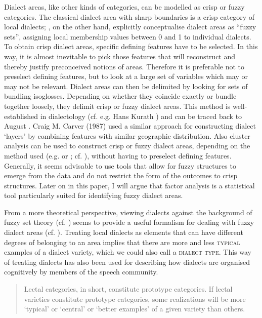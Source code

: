 \documentclass[output=paper]{LSP/langsci}
\begin{document}
Dialect areas, like other kinds of categories, can be modelled as crisp or fuzzy categories. The classical dialect area with sharp boundaries is a crisp category of local dialects; \citet[108--113]{preston_applications_1993}, on the other hand, explicitly conceptualise dialect areas as “fuzzy sets”, assigning local membership values between 0 and 1 to individual dialects. To obtain crisp dialect areas, specific defining features have to be selected. In this way, it is almost inevitable to pick those features that will reconstruct and thereby justify preconceived notions of areas. Therefore it is preferable not to preselect defining features, but to look at a large set of variables which may or may not be relevant. Dialect areas can then be delimited by looking for sets of bundling isoglosses. Depending on whether they coincide exactly or bundle together loosely, they delimit crisp or fuzzy dialect areas. This method is well-established in dialectology (cf. e.g. Hans Kurath \citeyear{kurath_studies_1972}) and can be traced back to August \citet{bielenstein_grenzen_1892}. Craig M. Carver (1987) %
used a similar approach for constructing dialect ‘layers’ by combining features with similar geographic distribution. Also cluster analysis can be used to construct crisp or fuzzy dialect areas, depending on the method used (e.g.  or ; cf. \citealt[83]{nerbonne_gabmap_2011}), without having to preselect defining features. Generally, it seems advisable to use tools that allow for fuzzy structures to emerge from the data and do not restrict the form of the outcomes to crisp structures. Later on in this paper, I will argue that factor analysis is a statistical tool particularly suited for identifying fuzzy dialect areas.

From a more theoretical perspective, viewing dialects against the background of fuzzy set theory (cf. \citealt{zadeh_fuzzy_1965}) seems to provide a useful formalism for dealing with fuzzy dialect areas (cf. \citealt{preston_applications_1993}). Treating local dialects as elements that can have different degrees of belonging to an area implies that there are more and less \textsc{typical} examples of a dialect variety, which we could also call a \textsc{dialect type}. This way of treating dialects has also been used for describing how dialects are organised cognitively by members of the speech community.

\begin{quote}
Lectal categories, in short, constitute prototype categories. If lectal varieties constitute prototype categories, some realizations will be more ‘typical’ or ‘central’ or ‘better examples’ of a given variety than others. \citep[59]{kristiansen_style-shifting_2008}
\end{quote}
\end{document}
